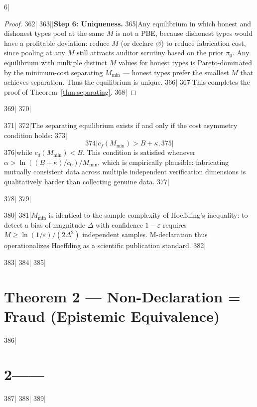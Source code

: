 6|\documentclass[12pt,a4paper]{article}
\begin{document}
\begin{proof}
362|
363||\noindent\textbf{Step 6: Uniqueness.}
365|Any equilibrium in which honest and dishonest types pool at the same $M$ is not a PBE, because dishonest types would have a profitable deviation: reduce $M$ (or declare $\varnothing$) to reduce fabrication cost, since pooling at any $M$ still attracts auditor scrutiny based on the prior $\pi_0$. Any equilibrium with multiple distinct $M$ values for honest types is Pareto-dominated by the minimum-cost separating $M_{\min}$ — honest types prefer the smallest $M$ that achieves separation. Thus the equilibrium is unique.
366|
367|This completes the proof of Theorem~\ref{thm:separating}.
368|\end{proof}
369|
370|\begin{corollary}
371|\label{cor:cost_asymmetry}
372|The separating equilibrium exists if and only if the cost asymmetry condition holds:
373|\begin{equation}\label{eq:cost_asym}
374|    c_f(M_{\min}) > B + \kappa,
375|\end{equation}
376|while $c_d(M_{\min}) < B$. This condition is satisfied whenever $\alpha > \ln((B+\kappa)/c_0)/M_{\min}$, which is empirically plausible: fabricating mutually consistent data across multiple independent verification dimensions is qualitatively harder than collecting genuine data.
377|\end{corollary}
378|
379|\begin{corollary}
380|\label{cor:M_info}
381|$M_{\min}$ is identical to the sample complexity of Hoeffding's inequality: to detect a bias of magnitude $\Delta$ with confidence $1-\varepsilon$ requires $M \ge \ln(1/\varepsilon)/(2\Delta^2)$ independent samples. M-declaration thus operationalizes Hoeffding as a scientific publication standard.
382|\end{corollary}
383|
384|%
385|\section{Theorem 2 — Non-Declaration = Fraud (Epistemic Equivalence)}
386|\section{2——}
387|\label{sec:thm2}
388|%
389|
\end{document}
